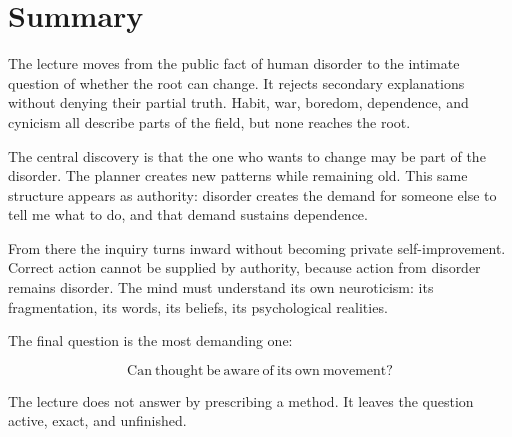 \section{Summary}

The lecture moves from the public fact of human disorder to the intimate question of whether the root can change. It rejects secondary explanations without denying their partial truth. Habit, war, boredom, dependence, and cynicism all describe parts of the field, but none reaches the root.

The central discovery is that the one who wants to change may be part of the disorder. The planner creates new patterns while remaining old. This same structure appears as authority: disorder creates the demand for someone else to tell me what to do, and that demand sustains dependence.

From there the inquiry turns inward without becoming private self-improvement. Correct action cannot be supplied by authority, because action from disorder remains disorder. The mind must understand its own neuroticism: its fragmentation, its words, its beliefs, its psychological realities.

The final question is the most demanding one:

\begin{equation}
\mathrm{Can\ thought\ be\ aware\ of\ its\ own\ movement?}
\end{equation}

The lecture does not answer by prescribing a method. It leaves the question active, exact, and unfinished.